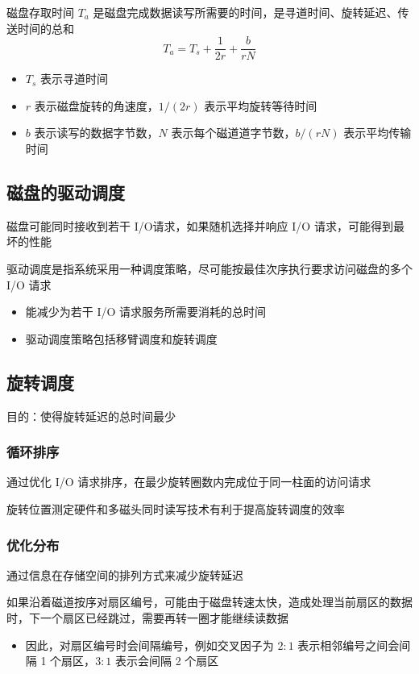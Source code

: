 \documentclass[cs4size,a4paper,10pt]{ctexart}
\begin{document}
	磁盘存取时间 $T_a$ 是磁盘完成数据读写所需要的时间，是寻道时间、旋转延迟、传送时间的总和$$T_a = T_s + \frac{1}{2r} + \frac{b}{rN}$$
	\begin{itemize}
		\item $T_s$ 表示寻道时间
		\item $r$ 表示磁盘旋转的角速度，$1/(2r)$ 表示平均旋转等待时间
		\item $b$ 表示读写的数据字节数，$N$ 表示每个磁道道字节数，$b/(rN)$ 表示平均传输时间
	\end{itemize}

	\subsection{磁盘的驱动调度}
	磁盘可能同时接收到若干 I/O请求，如果随机选择并响应 I/O 请求，可能得到最坏的性能

	驱动调度是指系统采用一种调度策略，尽可能按最佳次序执行要求访问磁盘的多个 I/O 请求
	\begin{itemize}
		\item 能减少为若干 I/O 请求服务所需要消耗的总时间
		\item 驱动调度策略包括移臂调度和旋转调度
	\end{itemize}

	\subsection{旋转调度}
	目的：使得旋转延迟的总时间最少

	\subsubsection{循环排序}
	通过优化 I/O 请求排序，在最少旋转圈数内完成位于同一柱面的访问请求

	旋转位置测定硬件和多磁头同时读写技术有利于提高旋转调度的效率

	\subsubsection{优化分布}
	通过信息在存储空间的排列方式来减少旋转延迟

	如果沿着磁道按序对扇区编号，可能由于磁盘转速太快，造成处理当前扇区的数据时，下一个扇区已经跳过，需要再转一圈才能继续读数据
	\begin{itemize}
		\item 因此，对扇区编号时会间隔编号，例如交叉因子为 $2:1$ 表示相邻编号之间会间隔 1 个扇区，$3:1$ 表示会间隔 2 个扇区
	\end{itemize}
\end{document}
